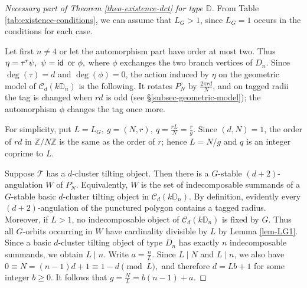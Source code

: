 \documentclass[12pt]{article}
\theoremstyle{plain}
\theoremstyle{definition}
\DeclareMathOperator{\id}{\sf id}
\newcommand{\T}{\mathcal{T}}
\renewcommand{\geq}{\geqslant}
\begin{document}
\begin{proof}[Necessary part of Theorem \ref{theo-existence-dct} for type $\mathbb{D}$]
From Table \ref{tab:existence-conditions}, we can assume that  
\(L_G>1\), since $L_G=1$ occurs in the conditions for each case.

Let first $n\neq 4$ or let the automorphism part have order at most two. Thus
\(\eta=\tau^r\psi,\ \psi=\id \text{ or } \phi,\)
where $\phi$ exchanges the two branch vertices of $D_n$. Since
$\deg(\tau)=d$ and $\deg(\phi)=0$, the action induced by $\eta$ on the
geometric model of $\mathcal C_d(k\mathbb D_n)$ is the following. It rotates
$P_N^\circ$ by $\frac{2\pi rd}{N}$, and on tagged radii the tag is changed when $rd$ is odd (see \S\ref{subsec-geometric-model}); the automorphism $\phi$ changes
the tag once more.

For simplicity, put
\(L=L_G,\ g=(N,r),\ q=\frac{rL}{N}=\frac rg .\)
Since $(d,N)=1$, the order of $rd$ in $\mathbb Z/N\mathbb Z$ is the same as
the order of $r$; hence $L=N/g$ and $q$ is an integer coprime to $L$.

Suppose $\T$ has a $d$-cluster tilting object. Then there is a  $G$-stable $(d+2)$-angulation $W$ of
$P_N^\circ$. Equivalently, $W$ is the set of indecomposable summands of a
$G$-stable basic $d$-cluster tilting object in $\mathcal C_d(k\mathbb D_n)$. By definition, evidently every $(d+2)$-angulation of the punctured polygon contains a tagged radius.
Moreover, if $L>1$, no indecomposable object of $\mathcal C_d(k\mathbb D_n)$
is fixed by $G$. Thus all $G$-orbits occurring in \(W\) have cardinality
divisible by \(L\) by Lemma \ref{lem-LG1}. Since a basic \(d\)-cluster tilting
object of type \(D_n\) has exactly \(n\) indecomposable summands, we obtain
\(L\mid n\). Write
\(a=\frac nL.\)
Since $L\mid N$ and $L\mid n$, we also have
\(0\equiv N=(n-1)d+1\equiv 1-d \pmod L,\)
and therefore
\(d=Lb+1\)
for some integer $b\geq 0$. It follows that
\(g=\frac NL=b(n-1)+a.\)


\end{proof}
\end{document}
